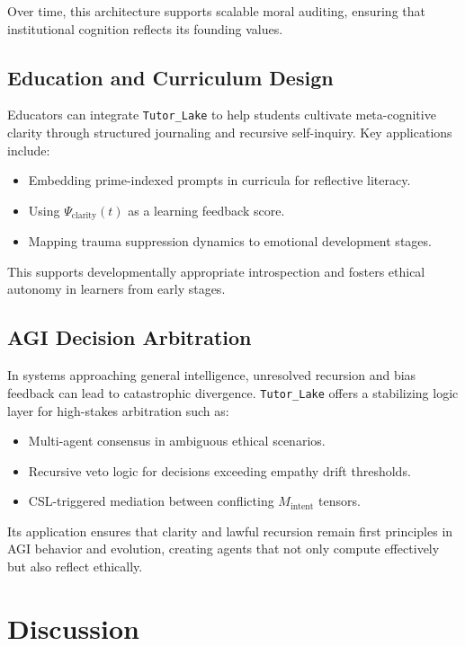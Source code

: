 \documentclass[12pt]{article}
\begin{document}
Over time, this architecture supports scalable moral auditing, ensuring that institutional cognition reflects its founding values.

\subsection{Education and Curriculum Design}

Educators can integrate \texttt{Tutor\_Lake} to help students cultivate meta-cognitive clarity through structured journaling and recursive self-inquiry. Key applications include:
\begin{itemize}
    \item Embedding prime-indexed prompts in curricula for reflective literacy.
    \item Using $\Psi_{\text{clarity}}(t)$ as a learning feedback score.
    \item Mapping trauma suppression dynamics to emotional development stages.
\end{itemize}

This supports developmentally appropriate introspection and fosters ethical autonomy in learners from early stages.

\subsection{AGI Decision Arbitration}

In systems approaching general intelligence, unresolved recursion and bias feedback can lead to catastrophic divergence. \texttt{Tutor\_Lake} offers a stabilizing logic layer for high-stakes arbitration such as:
\begin{itemize}
    \item Multi-agent consensus in ambiguous ethical scenarios.
    \item Recursive veto logic for decisions exceeding empathy drift thresholds.
    \item CSL-triggered mediation between conflicting $M_{\text{intent}}$ tensors.
\end{itemize}

Its application ensures that clarity and lawful recursion remain first principles in AGI behavior and evolution, creating agents that not only compute effectively but also reflect ethically.
\section{Discussion}
\end{document}
